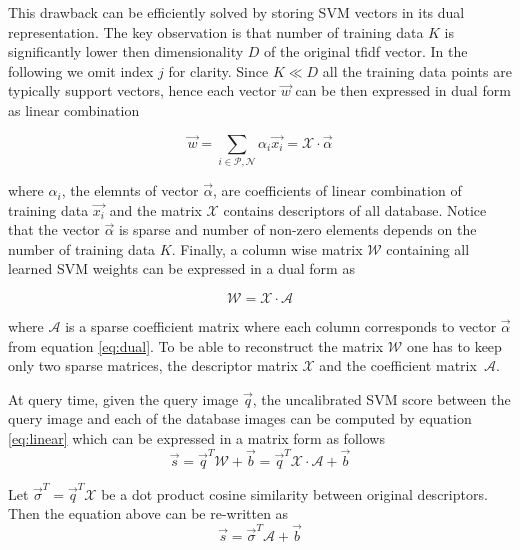       This drawback can be efficiently solved by storing SVM vectors in its dual representation. The key observation is that number of training data $K$ is significantly lower then dimensionality $D$ of the original tfidf vector. In the following we omit index $j$ for clarity. Since $K\ll D$ all the training data points are typically support vectors, hence each vector $\vec{w}$ can be then expressed in dual form as linear combination

      \begin{equation}
        \vec{w}=\sum_{i\in \mathcal{P},\mathcal{N}} \alpha_i \vec{x_i} = \mathcal{X} \cdot \vec{\alpha}
        \label{eq:dual}
      \end{equation}

      \noindent
      where $\alpha_i$, the elemnts of vector $\vec{\alpha}$, are coefficients of linear combination of training data $\vec{x_i}$ and the matrix $\mathcal{X}$ contains descriptors of all database. Notice that the vector $\vec{\alpha}$ is sparse and number of non-zero elements depends on the number of training data $K$. Finally, a column wise matrix $\mathcal{W}$ containing all learned SVM weights can be expressed in a dual form as

      \begin{equation}
        \mathcal{W} = \mathcal{X}\cdot \mathcal{A}  
      \end{equation}

      \noindent
      where $\mathcal{A}$ is a sparse coefficient matrix where each column corresponds to vector $\vec{\alpha}$ from equation \eqref{eq:dual}. To be able to reconstruct the matrix $\mathcal{W}$ one has to keep only two sparse matrices, the descriptor matrix $\mathcal{X}$ and the coefficient matrix~$\mathcal{A}$.

      At query time, given the query image $\vec{q}$, the uncalibrated SVM score between the query image and each of the database images can be computed by equation \eqref{eq:linear} which can be expressed in a matrix form as follows
      \begin{equation}
        \vec{s}=\vec{q}^T \mathcal{W}+\vec{b}=\vec{q}^T \mathcal{X}\cdot \mathcal{A}+\vec{b}
      \end{equation}

      Let $\vec{\sigma}^T=\vec{q}^T \mathcal{X}$ be a dot product cosine similarity between original descriptors. Then the equation above can be re-written as
      \begin{equation}
        \vec{s}=\vec{\sigma}^T \mathcal{A}+\vec{b}
      \end{equation}

